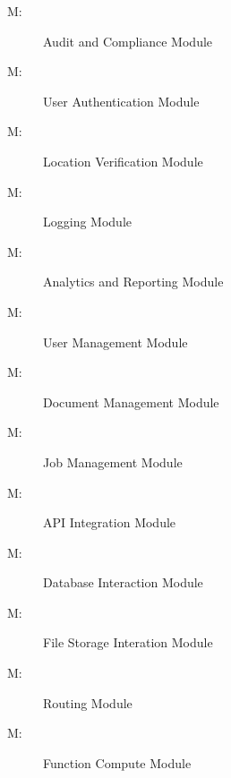 \documentclass[12pt, titlepage]{article}
\newcounter{mnum}
\newcommand{\mthemnum}{M\themnum}
\begin{document}
\begin{description}
  \item [ \mthemnum \label{mAC}:] Audit and
    Compliance Module
  \item [ \mthemnum \label{mUA}:] User
    Authentication Module
  \item [ \mthemnum \label{mLV}:] Location Verification
    Module
  \item [ \mthemnum \label{mLM}:] Logging Module
  \item [ \mthemnum \label{mAR}:] Analytics and Reporting
    Module
  \item [ \mthemnum \label{mUM}:] User Management Module
  \item [ \mthemnum \label{mDM}:] Document
    Management Module
  \item [ \mthemnum \label{mJM}:] Job Management Module
  \item [ \mthemnum \label{mAI}:] API Integration Module
  \item [ \mthemnum \label{mDI}:] Database
    Interaction Module
  \item [ \mthemnum \label{mBS}:] File Storage Interation
    Module
  \item [ \mthemnum \label{mRR}:] Routing Module
  \item [ \mthemnum \label{mFC}:] Function Compute Module
\end{description}
\end{document}
